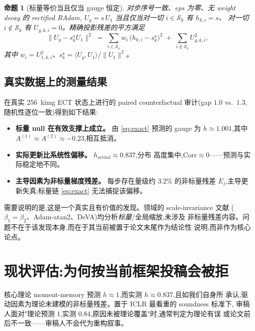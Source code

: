 \documentclass[UTF8,11pt,a4paper]{ctexart}
\newtheorem{proposition}{命题}[section]
\begin{document}
\begin{proposition}[标量等价当且仅当 gauge 恒定]
\label{prop:scalar}
对步序号一致、eps 为零、无 weight decay 的 rectified RAdam,
$U_g = s\,U_1$ 当且仅当对一切 $i\in\mathcal{S}_k$ 有 $h_{k,i}=s$、
对一切 $i\notin\mathcal{S}_k$ 有 $U_{g,k,i}=0$。精确投影残差的平方满足
\begin{equation}
  \bigl\lVert U_g - s^\star_k U_1\bigr\rVert^2
  \;=\; \sum_{i\in\mathcal{S}_k} w_i\,\bigl(h_{k,i}-s^\star_k\bigr)^2
      \;+\; \sum_{i\notin\mathcal{S}_k} U_{g,k,i}^2,
  \label{eq:residual}
\end{equation}
其中 $w_i=U_{1,k,i}^2$、$s^\star_k = \langle U_g,U_1\rangle/\lVert U_1\rVert^2$。
\end{proposition}

\subsection{真实数据上的测量结果}
在真实 256~kimg ECT 状态上进行的 paired counterfactual 审计(gap $1.0$ vs.\ $1.3$,
随机性逐位一致)得到如下结果:
\begin{itemize}
  \item \textbf{标量 null 在有效支撑上成立。} 由 \eqref{eq:exact} 预测的 gauge
        为 $h\approx 1.001$,其中 $A^{(1)}\approx A^{(2)}\approx -0.23$,相互抵消。
  \item \textbf{实际更新比系统性偏移。} $h_{\mathrm{actual}}\approx 0.837$,分布
        高度集中,$\mathrm{Corr}\approx 0$——预测与实际稳定地不同。
  \item \textbf{主导因素为非标量梯度残差。} 每步存在量级约 $3.2\%$ 的非标量残差
        $E_j$,主导更新失真;标量链 \eqref{eq:exact} 无法捕捉该偏移。
\end{itemize}

需要说明的是,这是一个真实且有价值的发现。领域的 scale-invariance 文献
($\beta_1{=}\beta_2$、Adam-atan2、DeVA)均分析\emph{标量}/全局缩放,未涉及
非标量残差内容。问题不在于该发现本身,而在于其当前被置于论文末尾作为结论性
说明,而非作为核心论点。

\section{现状评估:为何按当前框架投稿会被拒}
\label{sec:strategy}

核心理论 moment-memory 预测 $h\approx1$,而实测 $h\approx0.837$,且如我们自身所
承认,驱动因素为理论未建模的非标量残差。置于 ICLR 最看重的 soundness 标准下,
审稿人面对"理论预测 $1$,实测 $0.84$,原因未被理论覆盖"时,通常判定为理论有误
或论文前后不一致——审稿人不会代为重构叙事。
\end{document}
